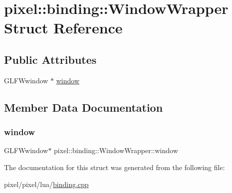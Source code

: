 \hypertarget{structpixel_1_1binding_1_1_window_wrapper}{}\section{pixel\+:\+:binding\+:\+:Window\+Wrapper Struct Reference}
\label{structpixel_1_1binding_1_1_window_wrapper}
\subsection*{Public Attributes}
\begin{DoxyCompactItemize}
\item 
G\+L\+F\+Wwindow $\ast$ \hyperlink{structpixel_1_1binding_1_1_window_wrapper_a49a1d44217292fc1af03654b8a78b8f1}{window}
\end{DoxyCompactItemize}


\subsection{Member Data Documentation}
\mbox{\label{structpixel_1_1binding_1_1_window_wrapper_a49a1d44217292fc1af03654b8a78b8f1}} 
\subsubsection{\texorpdfstring{window}{window}}
{\footnotesize\ttfamily G\+L\+F\+Wwindow$\ast$ pixel\+::binding\+::\+Window\+Wrapper\+::window}



The documentation for this struct was generated from the following file\+:\begin{DoxyCompactItemize}
\item 
pixel/pixel/lua/\hyperlink{binding_8cpp}{binding.\+cpp}\end{DoxyCompactItemize}
